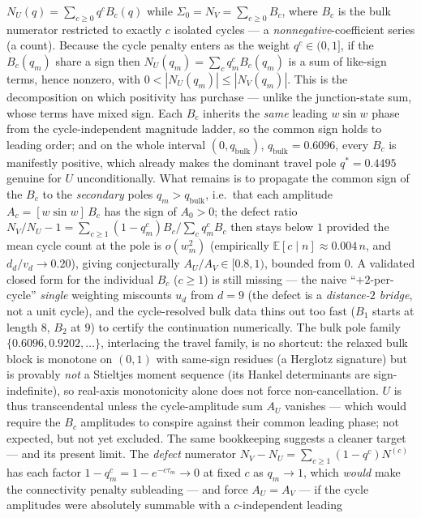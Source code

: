 \documentclass[11pt,a4paper]{article}
\theoremstyle{remark}
\theoremstyle{plain}
\begin{document}
$N_U(q)=\sum_{c\ge0} q^{c} B_c(q)$ while $\Sigma_0=N_V=\sum_{c\ge0}B_c$, where
$B_c$ is the bulk numerator restricted to exactly $c$ isolated cycles --- a
\emph{nonnegative}-coefficient series (a count). Because the cycle penalty enters
as the weight $q^{c}\in(0,1]$, if the $B_c(q_m)$ share a sign then
$N_U(q_m)=\sum_c q_m^{c}B_c(q_m)$ is a sum of like-sign terms, hence nonzero, with
$0<|N_U(q_m)|\le|N_V(q_m)|$. This is the decomposition on which positivity has
purchase --- unlike the junction-state sum, whose terms have mixed sign. Each
$B_c$ inherits the \emph{same} leading $w\sin w$ phase from the cycle-independent
magnitude ladder, so the common sign holds to leading order; and on the whole
interval $(0,q_{\mathrm{bulk}})$, $q_{\mathrm{bulk}}=0.6096$, every $B_c$ is
manifestly positive, which already makes the dominant travel pole
$q^*=0.4495$ genuine for $U$ unconditionally. What remains is to propagate the
common sign of the $B_c$ to the \emph{secondary} poles $q_m>q_{\mathrm{bulk}}$,
i.e.\ that each amplitude $A_c=[w\sin w]\,B_c$ has the sign of $A_0>0$; the
defect ratio $N_V/N_U-1=\sum_{c\ge1}(1-q_m^{c})B_c/\sum_c q_m^cB_c$ then stays
below $1$ provided the mean cycle count at the pole is $o(w_m^2)$ (empirically
$\mathbb E[c\mid n]\approx0.004\,n$, and $d_d/v_d\to0.20$), giving conjecturally
$A_U/A_V\in[0.8,1)$, bounded from $0$. A validated closed form for the individual
$B_c$ ($c\ge1$) is still missing --- the naive ``$+2$-per-cycle'' \emph{single}
weighting miscounts $u_d$ from $d=9$ (the defect is a \emph{distance-$2$ bridge},
not a unit cycle), and the cycle-resolved bulk data thins out too fast ($B_1$
starts at length $8$, $B_2$ at $9$) to certify the continuation numerically. The
bulk pole family $\{0.6096, 0.9202,\dots\}$, interlacing the travel family, is no
shortcut: the relaxed bulk block is monotone on $(0,1)$ with same-sign residues
(a Herglotz signature) but is provably \emph{not} a Stieltjes moment sequence
(its Hankel determinants are sign-indefinite), so real-axis monotonicity alone
does not force non-cancellation. $U$ is thus transcendental unless the
cycle-amplitude sum $A_U$ vanishes --- which would require the $B_c$ amplitudes
to conspire against their common leading phase; not expected, but not yet
excluded.  The same bookkeeping suggests a cleaner target --- and its present
limit.  The \emph{defect} numerator $N_V-N_U=\sum_{c\ge1}(1-q^{c})N^{(c)}$ has
each factor $1-q_m^{c}=1-e^{-c\tau_m}\to0$ at fixed $c$ as $q_m\to1$, which
\emph{would} make the connectivity penalty subleading --- and force $A_U=A_V$ ---
if the cycle amplitudes were absolutely summable with a $c$-independent leading
\end{document}
